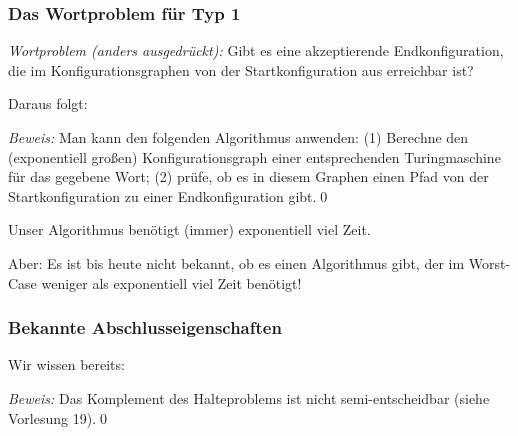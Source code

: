 \documentclass[aspectratio=1610,onlymath]{beamer}
\begin{document}
\begin{frame}\frametitle{Das Wortproblem für Typ 1}

\emph{Wortproblem (anders ausgedrückt):} Gibt es eine akzeptierende
Endkonfiguration, die im Konfigurationsgraphen von der Startkonfiguration aus erreichbar ist?
\medskip\pause

Daraus folgt:\medskip


\emph{Beweis:} Man kann den folgenden Algorithmus anwenden: (1) Berechne den (exponentiell großen) Konfigurationsgraph einer entsprechenden Turingmaschine für das gegebene Wort; (2) prüfe, ob es in diesem Graphen einen Pfad von der Startkonfiguration zu einer Endkonfiguration gibt.\qed
\medskip

Unser Algorithmus benötigt (immer) exponentiell viel Zeit.
\medskip

\alert{Aber:} Es ist bis heute nicht bekannt, ob es einen Algorithmus gibt, der im Worst-Case weniger als exponentiell viel Zeit benötigt!
\bigskip\pause


\end{frame}


\begin{frame}\frametitle{Bekannte Abschlusseigenschaften}

Wir wissen bereits:\medskip

\medskip\pause

\medskip

\emph{Beweis:} Das Komplement des Halteproblems ist nicht semi-entscheidbar (siehe Vorlesung 19).\qed



\end{frame}
\end{document}
